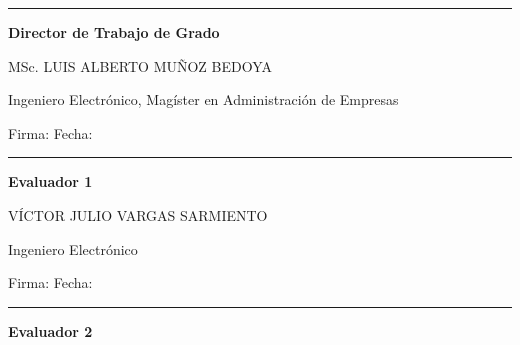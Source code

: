 \vspace{2cm}

\noindent
\rule{\textwidth}{0.5pt}

\vspace{0.3cm}

\noindent
\textbf{Director de Trabajo de Grado}

\vspace{0.2cm}

\noindent
MSc. LUIS ALBERTO MUÑOZ BEDOYA

\noindent
Ingeniero Electrónico, Magíster en Administración de Empresas

\vspace{0.3cm}

\noindent
Firma: \underline{\hspace{7cm}} \quad Fecha: \underline{\hspace{2cm}}

\vspace{2cm}

\noindent
\rule{\textwidth}{0.5pt}

\vspace{0.3cm}

\noindent
\textbf{Evaluador 1}

\vspace{0.2cm}

\noindent
VÍCTOR JULIO VARGAS SARMIENTO

\noindent
Ingeniero Electrónico

\vspace{0.3cm}

\noindent
Firma: \underline{\hspace{7cm}} \quad Fecha: \underline{\hspace{2cm}}

\vspace{2cm}

\noindent
\rule{\textwidth}{0.5pt}

\vspace{0.3cm}

\noindent
\textbf{Evaluador 2}

